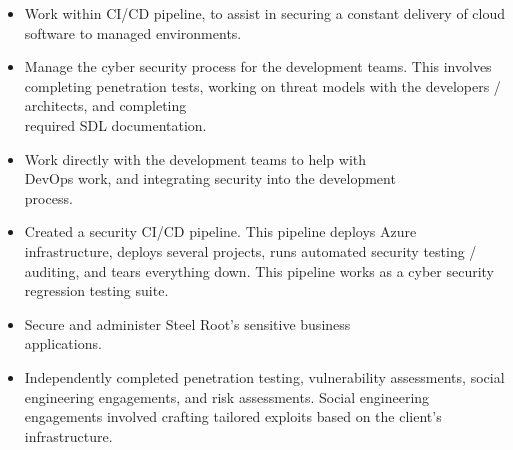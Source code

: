 \documentclass[10pt,a4paper,ragged2e]{rohrbach}
\begin{document}
\begin{paracol}{2}

\begin{itemize}
\item Work within CI/CD pipeline, to assist in securing a constant \break delivery of cloud software to managed environments.
\item Manage the cyber security process for the development teams. This involves completing penetration tests, working on threat models with the developers / architects, and completing\\ required SDL documentation. 
\item Work directly with the development teams to help with\\ DevOps work, and integrating security into the development\\ process.
\item Created a security CI/CD pipeline. This pipeline deploys Azure infrastructure, deploys several projects, runs automated security testing / auditing, and tears everything down. This pipeline works as a cyber security regression testing suite.
\end{itemize}

\divider

\begin{itemize}
\item Secure and administer Steel Root's sensitive business\\ applications.
\end{itemize}

\divider

\begin{itemize}
\item Independently completed penetration testing, vulnerability \break assessments, social engineering engagements, and risk assessments. Social engineering engagements involved crafting tailored exploits based on the client's infrastructure. 
\end{itemize}


\end{paracol}
\end{document}
